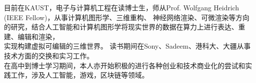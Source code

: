 

\begin{cvparagraph}
目前在KAUST，电子与计算机工程在读博士生，师从Prof. Wolfgang Heidrich (IEEE Fellow)，从事计算机图形学、三维重构、
神经网络渲染、可微渲染等方向的研究，结合人工智能和计算机图形学将现实世界的数据在算力上进行表达、重建、编辑和渲染，\\
实现构建虚拟可编辑的三维世界。
读书期间在Sony、Sadeem、港科大、大疆从事技术方面的交换和实习工作。\\
在高中到博士学习期间，本人亦开始积极的进行各种创业和技术商业化的尝试和实践工作，涉及人工智能，游戏，区块链等领域。
\end{cvparagraph}

